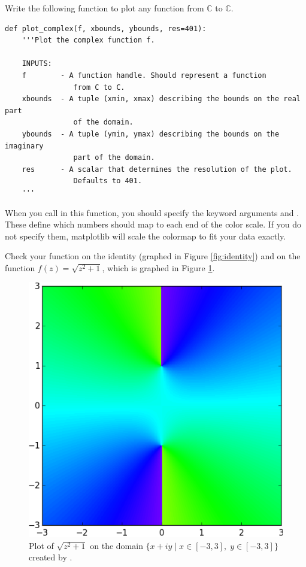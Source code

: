 \begin{problem}
Write the following function to plot any function from $\mathbb{C}$ to $\mathbb{C}$.
\begin{lstlisting}
def plot_complex(f, xbounds, ybounds, res=401):
    '''Plot the complex function f.
    
    INPUTS:
    f        - A function handle. Should represent a function 
    			from C to C.
    xbounds  - A tuple (xmin, xmax) describing the bounds on the real part 
    			of the domain.
    ybounds  - A tuple (ymin, ymax) describing the bounds on the imaginary 
    			part of the domain.
    res      - A scalar that determines the resolution of the plot. 
    			Defaults to 401.
    '''
\end{lstlisting}
When you call  in this function, you should specify the keyword arguments  and . 
These define which numbers should map to each end of the color scale. 
If you do not specify them, matplotlib will scale the colormap to fit your data exactly.

Check your function on the identity (graphed in Figure \ref{fig:identity}) and on the function $f(z) = \sqrt{z^2+1}$, which is graphed in Figure \ref{fig:check_plot}.
\begin{figure}[H]
\includegraphics[width=.7\textwidth]{check_plot.png}
\caption{Plot of $\sqrt{z^2+1}$ on the domain $\{x+iy \mid x \in [-3,3] , \; y \in [-3,3]\}$ created by .}
\label{fig:check_plot}
\end{figure}

\end{problem}


